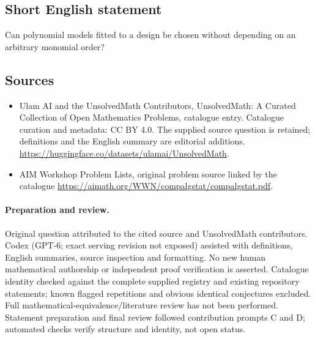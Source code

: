 \documentclass[11pt]{article}
\begin{document}
\subsection{Short English statement}
Can polynomial models fitted to a design be chosen without depending on an arbitrary monomial order?
\subsection{Sources}
\begin{itemize}
\item[\hypertarget{source:statement:1}{S1}] Ulam AI and the UnsolvedMath Contributors, UnsolvedMath: A Curated Collection of Open Mathematics Problems, catalogue entry. Catalogue curation and metadata: CC BY 4.0. The supplied source question is retained; definitions and the English summary are editorial additions.
\url{https://huggingface.co/datasets/ulamai/UnsolvedMath}.
\item[\hypertarget{source:statement:2}{S2}] AIM Workshop Problem Lists, original problem source linked by the catalogue
\url{https://aimath.org/WWN/compalgstat/compalgstat.pdf}.
\end{itemize}
\paragraph{Preparation and review.}
Original question attributed to the cited source and UnsolvedMath contributors. Codex (GPT-6; exact serving revision not exposed) assisted with definitions, English summaries, source inspection and formatting. No new human mathematical authorship or independent proof verification is asserted. Catalogue identity checked against the complete supplied registry and existing repository statements; known flagged repetitions and obvious identical conjectures excluded. Full mathematical-equivalence/literature review has not been performed. Statement preparation and final review followed contribution prompts C and D; automated checks verify structure and identity, not open status.
\label{end:statement}
\end{document}
